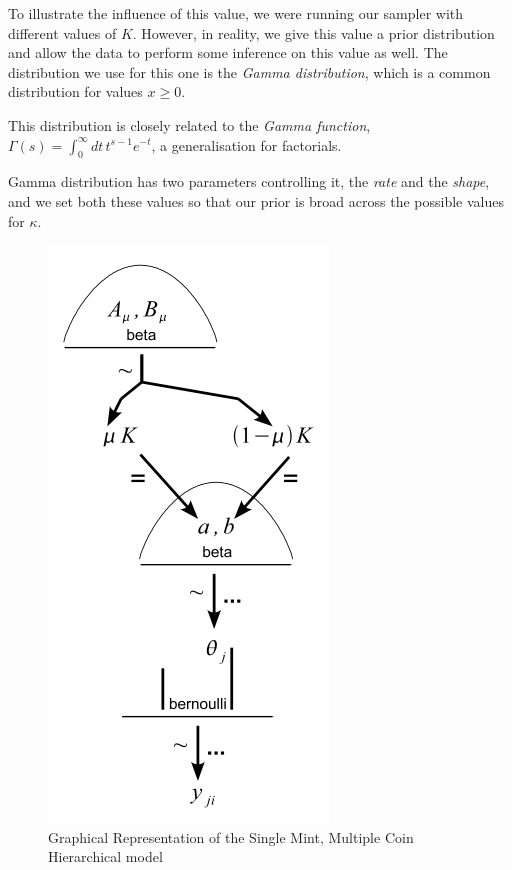 \documentclass[10pt, a4paper]{article}
\begin{document}
To illustrate the influence of this value, we were running our sampler
with different values of $K$. However, in reality, we give this value
a prior distribution and allow the data to perform some inference on
this value as well. The distribution we use for this one is the
\emph{Gamma distribution}, which is a common distribution for values
$x \geq 0$.

This distribution is closely related to the \emph{Gamma function},
$\Gamma(s) = \int^\infty_0 dt \, t^{s-1} e^{-t}$, a generalisation for
factorials.

Gamma distribution has two parameters controlling it, the
\emph{rate} and the \emph{shape}, and we set both these values so that
our prior is broad across the possible values for $\kappa$.


\begin{figure}[h]
\begin{center}
\includegraphics{hierarchical_singlemint_multiplecoin.png}
\caption{\label{fig_hiersingmult}
Graphical Representation of the Single Mint, Multiple Coin
Hierarchical model}
\end{center}
\end{figure}
\end{document}
